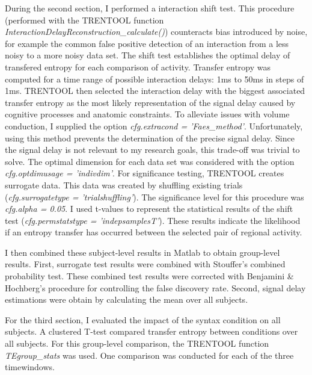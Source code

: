 During the second section, I performed a interaction shift test.
This procedure (performed with the TRENTOOL function \emph{InteractionDelayReconstruction\_calculate()}) counteracts bias introduced by noise, for example the common false positive detection of an interaction from a less noisy to a more noisy data set.
The shift test establishes the optimal delay of transfered entropy for each comparison of activity.
Transfer entropy was computed for a time range of possible interaction delays: 1ms to 50ms in steps of 1ms.
TRENTOOL then selected the interaction delay with the biggest associated transfer entropy as the most likely representation of the signal delay caused by cognitive processes and anatomic constraints.
To alleviate issues with volume conduction, I supplied the option \emph{cfg.extracond = 'Faes\_method'}.
Unfortunately, using this method prevents the determination of the precise signal delay.
Since the signal delay is not relevant to my research goals, this trade-off was trivial to solve.
The optimal dimension for each data set was considered with the option \emph{cfg.optdimusage = 'indivdim'}.
For significance testing, TRENTOOL creates surrogate data.
This data was created by shuffling existing trials (\emph{cfg.surrogatetype = 'trialshuffling'}).
The significance level for this procedure was \emph{cfg.alpha = 0.05}.
I used t-values to represent the statistical results of the shift test (\emph{cfg.permstatstype = 'indepsamplesT'}).
These results indicate the likelihood if an entropy transfer has occurred between the selected pair of regional activity.

I then combined these subject-level results in Matlab to obtain group-level results.
First, surrogate test results were combined with Stouffer's combined probability test.
These combined test results were corrected with Benjamini & Hochberg's procedure for controlling the false discovery rate.
Second, signal delay estimations were obtain by calculating the mean over all subjects.


For the third section, I evaluated the impact of the syntax condition on all subjects.
A clustered T-test compared transfer entropy between conditions over all subjects.
For this group-level comparison, the TRENTOOL function \emph{TEgroup\_stats} was used.
One comparison was conducted for each of the three timewindows.